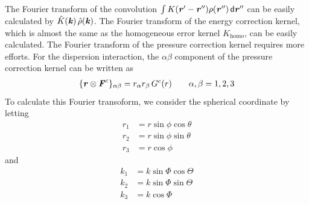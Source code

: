 \documentclass[aps,pre,preprint]{revtex4}
\renewcommand{\v}[1]{\textbf{\textit{#1}}}
\renewcommand{\d}[1]{\textsf{#1}}
\begin{document}
The Fourier transform of the convolution $\int K(\v r' - \v r'')
\rho(\v r'')\,\d d\v r''$ can be easily calculated by $\hat K(\v
k)\,\hat \rho(\v k)$.  The Fourier transform of the energy correction
kernel, which is almost the same as the homogeneous error kernel
$K_{\textrm{homo}}$, can be easily calculated. The Fourier transform
of the pressure correction kernel requires more efforts.  For the
dispersion interaction, the $\alpha\beta$ component of the pressure
correction kernel can be written as
\begin{align}
  \{\v r\otimes\v F^c\}_{\alpha\beta} = r_\alpha r_\beta \,G^c(r) \qquad \alpha, \beta = 1, 2, 3
\end{align}
To calculate this Fourier transoform, we consider the spherical
coordinate by letting
\begin{align} \nonumber
  r_1 &= r\sin\phi\cos\theta \\\nonumber
  r_2 &= r\sin\phi\sin\theta \\\nonumber
  r_3 &= r\cos\phi
\end{align}
and 
\begin{align} \nonumber
  k_1 &= k\sin\Phi\cos\Theta \\\nonumber
  k_2 &= k\sin\Phi\sin\Theta \\\nonumber
  k_3 &= k\cos\Phi
\end{align}
\end{document}
